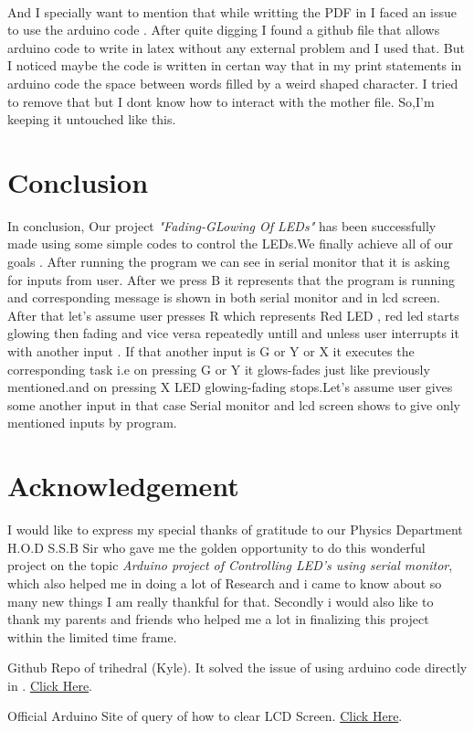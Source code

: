 \documentclass[a4paper]{article}
\begin{document}
\\
And I specially want to mention that while writting the PDF in  I faced an issue to use the arduino code . After quite digging I found a github file that allows arduino code to write in latex without any external problem and I used that. But I noticed maybe the code is written in certan way that in my print statements in arduino code the space between words filled by a weird shaped character. I tried to remove that but I  dont know how to interact with the mother file. So,I'm keeping it untouched like this.
\section{Conclusion}
In conclusion, Our project \textit{"Fading-GLowing Of LEDs"} has been successfully made using some simple codes to control the LEDs.We finally achieve all of our goals . After running the program we can see in serial monitor that it is asking for inputs from user. After we press B it represents that the program is running and corresponding message is shown in both serial monitor and in lcd screen.
After that let's assume user presses R which represents Red LED , red led  starts glowing then fading and vice versa repeatedly untill and unless user interrupts it with another input . If that another input is G or Y or X it executes the corresponding task i.e on pressing G or Y it glows-fades just like previously mentioned.and on pressing X LED glowing-fading stops.Let's assume user gives some another input in that case Serial monitor and lcd screen shows to give only mentioned inputs by program.

\section{Acknowledgement}
I would like to express my special thanks of gratitude to our Physics Department H.O.D S.S.B Sir who gave me the golden opportunity to do this wonderful project on the topic \textit{Arduino project of Controlling LED's using serial monitor}, which also helped me in doing a lot of Research and i came to know about so many new things I am really thankful for that.
Secondly i would also like to thank my parents and friends who helped me a lot in finalizing this project within the limited time frame.

\begin{thebibliography}{}
Github Repo of trihedral (Kyle). It solved the issue of using arduino code directly in \text{\LaTeX\ } .
\href{https://github.com/trihedral/ArduinoLatexListing}{Click Here}.

Official Arduino Site of query of how to clear LCD Screen.
\href{https://www.arduino.cc/en/Reference/LiquidCrystalClear}{Click Here}.

\end{thebibliography}
\end{document}
